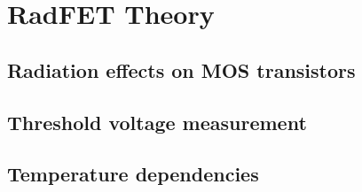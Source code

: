 \section{RadFET Theory}

    \subsection{Radiation effects on MOS transistors}
    \label{Radiation_effects_on_MOS_transistors}

    \subsection{Threshold voltage measurement}

    \subsection{Temperature dependencies}
